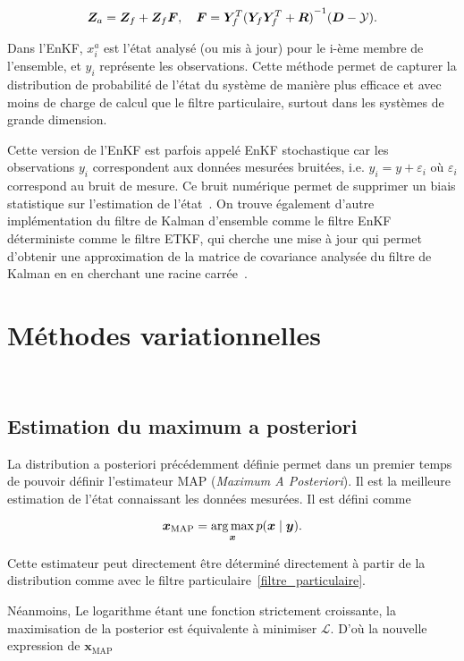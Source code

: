 \begin{equation}
    \bm{Z}_a = \bm{Z}_f + \bm{Z}_f \bm{F}, \quad \bm{F} = \bm Y_f^T {(\bm Y_f \bm Y_f^T + \bm R)}^{-1}(\bm{D} - \mathcal{Y}).
\end{equation}


Dans l'EnKF, $x_{i}^{a}$ est l'état analysé (ou mis à jour) pour le i-ème membre de l'ensemble, et $y_i$ représente les observations. Cette méthode permet de capturer la distribution de probabilité de l'état du système de manière plus efficace et avec moins de charge de calcul que le filtre particulaire, surtout dans les systèmes de grande dimension.

Cette version de l'EnKF est parfois appelé EnKF stochastique car les observations $y_i$ correspondent aux données mesurées bruitées, i.e. $y_i = y + \varepsilon_i$ où $\varepsilon_i$ correspond au bruit de mesure. Ce bruit numérique permet de supprimer un biais statistique sur l'estimation de l'état~\cite{van_leeuwen_consistent_2020}. On trouve également d'autre implémentation du filtre de Kalman d'ensemble comme le filtre EnKF déterministe comme le filtre ETKF, qui cherche une mise à jour qui permet d'obtenir une approximation de la matrice de covariance analysée du filtre de Kalman en en cherchant une racine carrée~\cite{bishop_adaptive_2001}.

\section{Méthodes variationnelles}~\label{sec:variation}
\subsection{Estimation du maximum a posteriori}

La distribution a posteriori précédemment définie permet dans un premier temps de pouvoir définir l'estimateur MAP (\textit{Maximum A Posteriori}). Il est la meilleure estimation de l'état connaissant les données mesurées. Il est défini comme

\begin{equation*}
    \bm x_{\text{MAP}} = \operatorname*{arg\,max}_{\bm x} p(\bm x \mid \bm y).
\end{equation*}

Cette estimateur peut directement être déterminé directement à partir de la distribution comme avec le filtre particulaire~\ref{filtre_particulaire}.

Néanmoins, Le logarithme étant une fonction strictement croissante, la maximisation de la posterior est équivalente à minimiser $\mathcal L$. D'où la nouvelle expression de $\bm x_{\text{MAP}}$

